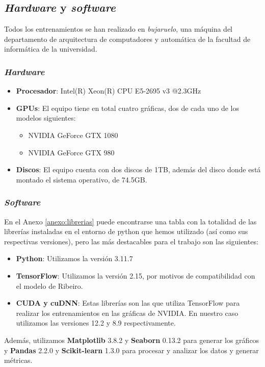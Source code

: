 \subsection{\emph{Hardware} y \emph{software}}
Todos los entrenamientos se han realizado en \emph{bujaruelo}, una máquina del departamento de arquitectura de computadores y automática de la facultad de informática de la universidad.
\subsubsection{\emph{Hardware}}
\begin{itemize}
	\item \textbf{Procesador}: Intel(R) Xeon(R) CPU E5-2695 v3 @2.3GHz
	\item  \textbf{GPUs}: El equipo tiene en total cuatro gráficas, dos de cada uno de los modelos siguientes:
	\begin{itemize}
		\item NVIDIA GeForce GTX 1080
		\item NVIDIA GeForce GTX 980
	\end{itemize}
	\item \textbf{Discos}: El equipo cuenta con dos discos de 1TB, además del disco donde está montado el sistema operativo, de 74.5GB.
\end{itemize}
\subsubsection{\emph{Software}}
En el Anexo \ref{anexo:librerias} puede encontrarse una tabla con la totalidad de las librerías instaladas en el entorno de python que hemos utilizado (así como sus respectivas versiones), pero las más destacables para el trabajo son las siguientes:

\begin{itemize}
	\item \textbf{Python}: Utilizamos la versión 3.11.7
	\item \textbf{TensorFlow}: Utilizamos la versión 2.15, por motivos de compatibilidad con el modelo de Ribeiro.
	\item \textbf{CUDA y cuDNN}: Estas librerías son las que utiliza TensorFlow para realizar los entrenamientos en las gráficas de NVIDIA. En nuestro caso utilizamos las versiones 12.2 y 8.9 respectivamente.
\end{itemize}

Además, utilizamos \textbf{Matplotlib} 3.8.2 y \textbf{Seaborn} 0.13.2 para generar los gráficos y \textbf{Pandas} 2.2.0 y \textbf{Scikit-learn} 1.3.0 para procesar y analizar los datos y generar métricas.


